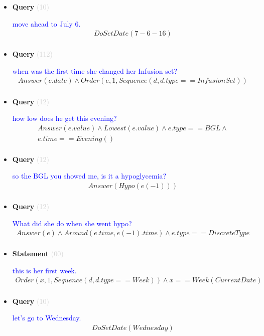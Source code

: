 \documentclass[11pt]{article}
\newcommand{\key}[1]{\textcolor{lightgray}{#1}}
\newcounter{CQuery}
\newcounter{CStatement}
\begin{document}
\begin{itemize}
\item
\textbf{Query\theCQuery} \key{(10)} \addtocounter{CQuery}{1}
\textcolor{blue}{ move ahead to July 6. }
\begin{multline*}
DoSetDate(7-6-16) \\ 
\end{multline*}


\item
\textbf{Query\theCQuery} \key{(112)} \addtocounter{CQuery}{1}
\textcolor{blue}{ when was the first time she changed her Infusion set? }
\begin{multline*}
Answer(e.date) \wedge Order(e, 1, Sequence(d, d.type==InfusionSet)) \\ 
\end{multline*}


\item
\textbf{Query\theCQuery} \key{(12)} \addtocounter{CQuery}{1}
\textcolor{blue}{ how low does he get this evening? }
\begin{multline*}
Answer(e.value) \wedge Lowest(e.value) \wedge e.type==BGL \wedge \\ 
e.time==Evening() \\ 
\end{multline*}


\item
\textbf{Query\theCQuery} \key{(12)} \addtocounter{CQuery}{1}
\textcolor{blue}{ so the BGL you showed me, is it a hypoglycemia? }
\begin{multline*}
Answer(Hypo(e(-1))) \\ 
\end{multline*}


\item
\textbf{Query\theCQuery} \key{(12)} \addtocounter{CQuery}{1}
\textcolor{blue}{ What did she do when she went hypo? }
\begin{multline*}
Answer(e) \wedge Around(e.time, e(-1).time) \wedge e.type==DiscreteType \\ 
\end{multline*}


\item
\textbf{Statement\theCStatement} \key{(00)} \addtocounter{CStatement}{1}
\textcolor{blue}{ this is her first week. }
\begin{multline*}
Order(x, 1, Sequence(d, d.type==Week)) \wedge x==Week(CurrentDate) \\ 
\end{multline*}


\item
\textbf{Query\theCQuery} \key{(10)} \addtocounter{CQuery}{1}
\textcolor{blue}{ let's go to Wednesday. }
\begin{multline*}
DoSetDate(Wednesday) \\ 
\end{multline*}



\end{itemize}
\end{document}
